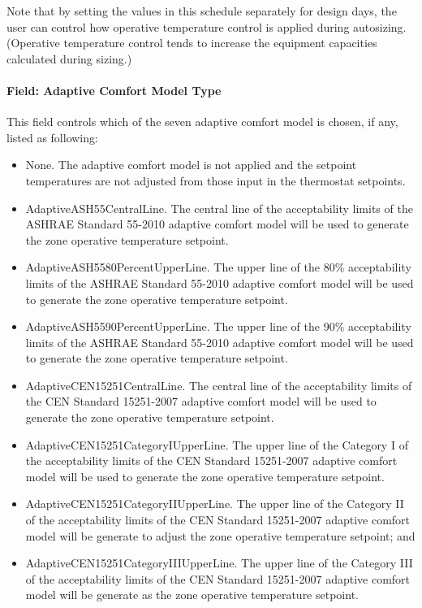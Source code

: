 Note that by setting the values in this schedule separately for design days, the user can control how operative temperature control is applied during autosizing. (Operative temperature control tends to increase the equipment capacities calculated during sizing.)

\paragraph{Field: Adaptive Comfort Model Type}\label{field-adaptive-comfort-mode-type}

This field controls which of the seven adaptive comfort model is chosen, if any, listed as following: 
\begin{itemize}
\tightlist
\item None. The adaptive comfort model is not applied and the setpoint temperatures are not adjusted from those input in the thermostat setpoints.
\item AdaptiveASH55CentralLine. The central line of the acceptability limits of the ASHRAE Standard 55-2010 adaptive comfort model will be used to generate the zone operative temperature setpoint.
\item AdaptiveASH5580PercentUpperLine. The upper line of the 80\% acceptability limits of the ASHRAE Standard 55-2010 adaptive comfort model will be used to generate the zone operative temperature setpoint.
\item AdaptiveASH5590PercentUpperLine. The upper line of the 90\% acceptability limits of the ASHRAE Standard 55-2010 adaptive comfort model will be used to generate the zone operative temperature setpoint. 
\item AdaptiveCEN15251CentralLine. The central line of the acceptability limits of the CEN Standard 15251-2007 adaptive comfort model will be used to generate the zone operative temperature setpoint.
\item AdaptiveCEN15251CategoryIUpperLine. The upper line of the Category I of the acceptability limits of the CEN Standard 15251-2007 adaptive comfort model will be used to generate the zone operative temperature setpoint.
\item AdaptiveCEN15251CategoryIIUpperLine. The upper line of the Category II of the acceptability limits of the CEN Standard 15251-2007 adaptive comfort model will be generate to adjust the zone operative temperature setpoint; and 
\item AdaptiveCEN15251CategoryIIIUpperLine. The upper line of the Category III of the acceptability limits of the CEN Standard 15251-2007 adaptive comfort model will be generate as the zone operative temperature setpoint.
\end{itemize}


